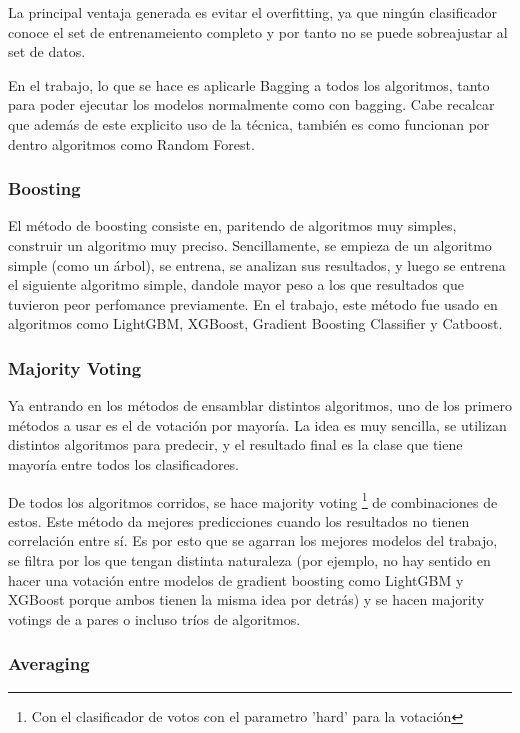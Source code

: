 \documentclass[a4paper]{article}
\begin{document}
La principal ventaja generada es evitar el overfitting, ya que ningún clasificador conoce el set de entrenameiento completo y por tanto no se puede sobreajustar al set de datos.

En el trabajo, lo que se hace es aplicarle Bagging a todos los algoritmos, tanto para poder ejecutar los modelos normalmente como con bagging. Cabe recalcar que además de este explicito uso de la técnica, también es como funcionan por dentro algoritmos como Random Forest.

\subsubsection{Boosting}

El método de boosting consiste en, paritendo de algoritmos muy simples, construir un algoritmo muy preciso. Sencillamente, se empieza de un algoritmo simple (como un árbol), se entrena, se analizan sus resultados, y luego se entrena el siguiente algoritmo simple, dandole mayor peso a los que resultados que tuvieron peor perfomance previamente. En el trabajo, este método fue usado en algoritmos como LightGBM, XGBoost, Gradient Boosting Classifier y Catboost.

\subsubsection{Majority Voting}

Ya entrando en los métodos de ensamblar distintos algoritmos, uno de los primero métodos a usar es el de votación por mayoría. La idea es muy sencilla, se utilizan distintos algoritmos para predecir, y el resultado final es la clase que tiene mayoría entre todos los clasificadores.

De todos los algoritmos corridos, se hace majority voting \footnote{Con el clasificador de votos con el parametro 'hard' para la votación} de combinaciones de estos. Este método da mejores predicciones cuando los resultados no tienen correlación entre sí. Es por esto que se agarran los mejores modelos del trabajo, se filtra por los que tengan distinta naturaleza (por ejemplo, no hay sentido en hacer una votación entre modelos de gradient boosting como LightGBM y XGBoost porque ambos tienen la misma idea por detrás) y se hacen majority votings de a pares o incluso tríos de algoritmos.

\subsubsection{Averaging}
\end{document}
